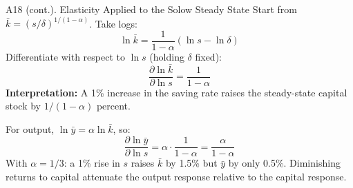 \documentclass[aspectratio=169,10pt]{beamer}
\newcommand{\backbutton}[1]{\hfill\hyperlink{#1}{\beamerbutton{Back}}}
\begin{document}
\begin{frame}{A18 (cont.). Elasticity Applied to the Solow Steady State}
\hypertarget{a18b}{}
Start from $\bar{k}=(s/\delta)^{1/(1-\alpha)}$. Take logs:
\[
\ln \bar{k} = \frac{1}{1-\alpha}\left(\ln s - \ln \delta\right)
\]
Differentiate with respect to $\ln s$ (holding $\delta$ fixed):
\[
\frac{\partial \ln \bar{k}}{\partial \ln s} = \frac{1}{1-\alpha}
\]
\textbf{Interpretation:} A 1\% increase in the saving rate raises the steady-state capital stock by $1/(1-\alpha)$ percent.

\medskip
For output, $\ln \bar{y} = \alpha \ln \bar{k}$, so:
\[
\frac{\partial \ln \bar{y}}{\partial \ln s} = \alpha \cdot \frac{1}{1-\alpha} = \frac{\alpha}{1-\alpha}
\]
With $\alpha=1/3$: a 1\% rise in $s$ raises $\bar{k}$ by 1.5\% but $\bar{y}$ by only 0.5\%. Diminishing returns to capital attenuate the output response relative to the capital response.
\backbutton{m-a18}
\end{frame}
\end{document}
